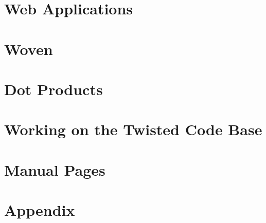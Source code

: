 \documentclass[oneside]{book}
\begin{document}
\chapter{Web Applications}






\chapter{Woven}











\chapter{Dot Products}







\chapter{Working on the Twisted Code Base}







\chapter{Manual Pages}


\clearpage

\clearpage

\clearpage

\clearpage

\clearpage

\clearpage

\clearpage

\clearpage

\clearpage

\clearpage



\chapter{Appendix}




\end{document}
